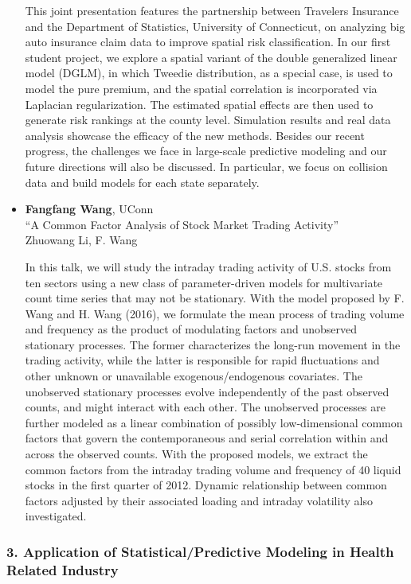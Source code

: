 \begin{itemize}
This joint presentation features the partnership between Travelers Insurance and the Department of Statistics, University of Connecticut, on analyzing big auto insurance claim data to improve spatial risk classification. In our first student project, we explore a spatial variant of the double generalized linear model (DGLM), in which Tweedie distribution, as a special case, is used to model the pure premium, and the spatial correlation is incorporated via Laplacian regularization. The estimated spatial effects are then used to generate risk rankings at the county level. Simulation results and real data analysis showcase the efficacy of the new methods. Besides our recent progress, the challenges we face in large-scale predictive modeling and our future directions will also be discussed. In particular, we focus on collision data and build models for each state separately.

\item \textbf{Fangfang Wang}, UConn \\
``A Common Factor Analysis of Stock Market Trading Activity'' \\
Zhuowang Li, F. Wang


In this talk, we will study the intraday trading activity of U.S. stocks from ten sectors using a new class of parameter-driven models for multivariate count time series that may not be stationary. With the  model proposed by F. Wang and H. Wang (2016), we formulate the mean process of trading volume and frequency as the product of modulating factors and unobserved stationary processes. The former characterizes the long-run movement in the trading activity, while the latter is responsible for rapid fluctuations and other unknown or unavailable exogenous/endogenous covariates. The unobserved stationary processes evolve independently of the past observed counts, and might interact with each other. The unobserved processes are further modeled as a linear combination of possibly low-dimensional common factors that govern the contemporaneous and serial correlation within and across the observed counts. With the proposed models, we extract the common factors from the intraday trading volume and  frequency of 40 liquid stocks in the first quarter of 2012. Dynamic relationship between common factors adjusted by their associated loading and intraday volatility also investigated.   

\end{itemize}

\subsubsection*{3. Application of Statistical/Predictive Modeling in Health Related Industry}

